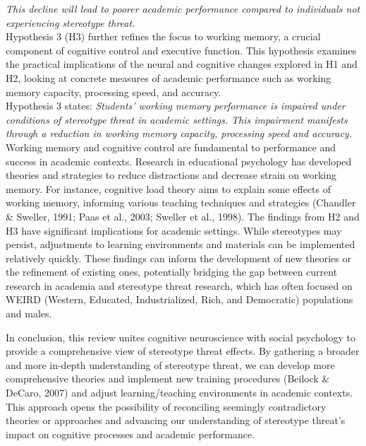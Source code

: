 \documentclass[
  stu, a4paper,floatsintext]{apa7}
\begin{document}
\emph{This decline will lead to poorer academic performance compared to individuals not experiencing stereotype threat.}\\
Hypothesis 3 (H3) further refines the focus to working memory, a crucial component of cognitive control and executive function.
This hypothesis examines the practical implications of the neural and cognitive changes explored in H1 and H2, looking at concrete measures of academic performance such as working memory capacity, processing speed, and accuracy.\\
Hypothesis 3 states: \emph{Students' working memory performance is impaired under conditions of stereotype threat in academic settings.}
\emph{This impairment manifests through a reduction in working memory capacity, processing speed and accuracy.}\\
Working memory and cognitive control are fundamental to performance and success in academic contexts. Research in educational psychology has developed theories and strategies to reduce distractions and decrease strain on working memory.
For instance, cognitive load theory aims to explain some effects of working memory, informing various teaching techniques and strategies (Chandler \& Sweller, 1991; Paas et al., 2003; Sweller et al., 1998).
The findings from H2 and H3 have significant implications for academic settings.
While stereotypes may persist, adjustments to learning environments and materials can be implemented relatively quickly.
These findings can inform the development of new theories or the refinement of existing ones, potentially bridging the gap between current research in academia and stereotype threat research, which has often focused on WEIRD (Western, Educated, Industrialized, Rich, and Democratic) populations and males.

In conclusion, this review unites cognitive neuroscience with social psychology to provide a comprehensive view of stereotype threat effects.
By gathering a broader and more in-depth understanding of stereotype threat, we can develop more comprehensive theories and implement new training procedures (Beilock \& DeCaro, 2007) and adjust learning/teaching environments in academic contexts.
This approach opens the possibility of reconciling seemingly contradictory theories or approaches and advancing our understanding of stereotype threat's impact on cognitive processes and academic performance.
\end{document}
